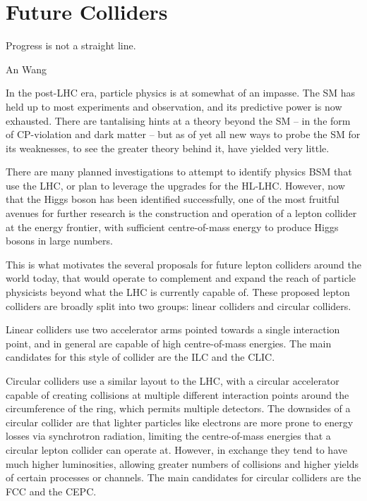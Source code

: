 \chapter{Future Colliders}
\label{chapter:colliders}

\epigraph{Progress is not a straight line.}{An Wang}

In the post-LHC era, particle physics is at somewhat of an impasse. The \acrfull{SM} has held up to most experiments and observation, and its predictive power is now exhausted. There are tantalising hints at a theory beyond the \acrlong{SM} -- in the form of CP-violation and dark matter -- but as of yet all new ways to probe the \acrshort{SM} for its weaknesses, to see the greater theory behind it, have yielded very little. 

There are many planned investigations to attempt to identify physics \acrlong{BSM} that use the \acrfull{LHC}, or plan to leverage the upgrades for the \acrfull{HL-LHC}. However, now that the Higgs boson has been identified successfully, one of the most fruitful avenues for further research is the construction and operation of a lepton collider at the energy frontier, with sufficient centre-of-mass energy to produce Higgs bosons in large numbers.

This is what motivates the several proposals for future lepton colliders around the world today, that would operate to complement and expand the reach of particle physicists beyond what the \acrshort{LHC} is currently capable of. These proposed lepton colliders are broadly split into two groups: linear colliders and circular colliders. 

Linear colliders use two accelerator arms pointed towards a single interaction point, and in general are capable of high centre-of-mass energies. The main candidates for this style of collider are the \acrfull{ILC} and the \acrfull{CLIC}. 

Circular colliders use a similar layout to the \acrshort{LHC}, with a circular accelerator capable of creating collisions at multiple different interaction points around the circumference of the ring, which permits multiple detectors. The downsides of a circular collider are that lighter particles like electrons are more prone to energy losses via synchrotron radiation, limiting the centre-of-mass energies that a circular lepton collider can operate at. However, in exchange they tend to have much higher luminosities, allowing greater numbers of collisions and higher yields of certain processes or channels. The main candidates for circular colliders are the \acrfull{FCC} and the \acrfull{CEPC}. 

